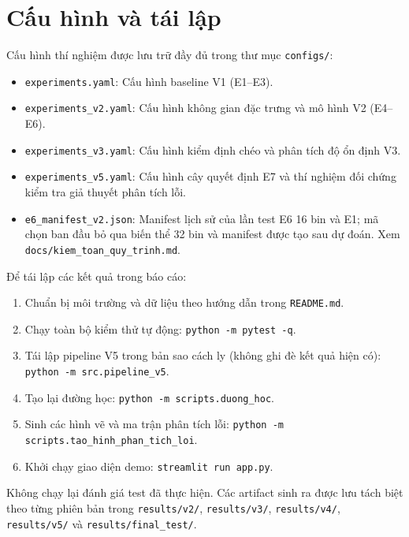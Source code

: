 \appendix
{}
\renewcommand{\cftchappresnum}{PHỤ LỤC~}
\sloppy
\chapter{Cấu hình và tái lập}
Cấu hình thí nghiệm được lưu trữ đầy đủ trong thư mục \texttt{configs/}:
\begin{itemize}
    \item \texttt{experiments.yaml}: Cấu hình baseline V1 (E1–E3).
    \item \texttt{experiments\_v2.yaml}: Cấu hình không gian đặc trưng và mô hình V2 (E4–E6).
    \item \texttt{experiments\_v3.yaml}: Cấu hình kiểm định chéo và phân tích độ ổn định V3.
    \item \texttt{experiments\_v5.yaml}: Cấu hình cây quyết định E7 và thí nghiệm đối chứng kiểm tra giả thuyết phân tích lỗi.
    \item \texttt{e6\_manifest\_v2.json}: Manifest lịch sử của lần test E6 16 bin và E1; mã chọn ban đầu bỏ qua biến thể 32 bin và manifest được tạo sau dự đoán. Xem \texttt{docs/kiem\_toan\_quy\_trinh.md}.
\end{itemize}

Để tái lập các kết quả trong báo cáo:
\begin{enumerate}
    \item Chuẩn bị môi trường và dữ liệu theo hướng dẫn trong \texttt{README.md}.
    \item Chạy toàn bộ kiểm thử tự động: \texttt{python -m pytest -q}.
    \item Tái lập pipeline V5 trong bản sao cách ly (không ghi đè kết quả hiện có): \texttt{python -m src.pipeline\_v5}.
    \item Tạo lại đường học: \texttt{python -m scripts.duong\_hoc}.
    \item Sinh các hình vẽ và ma trận phân tích lỗi: \texttt{python -m scripts.tao\_hinh\_phan\_tich\_loi}.
    \item Khởi chạy giao diện demo: \texttt{streamlit run app.py}.
\end{enumerate}
Không chạy lại đánh giá test đã thực hiện. Các artifact sinh ra được lưu tách biệt theo từng phiên bản trong \texttt{results/v2/}, \texttt{results/v3/}, \texttt{results/v4/}, \texttt{results/v5/} và \texttt{results/final\_test/}.
